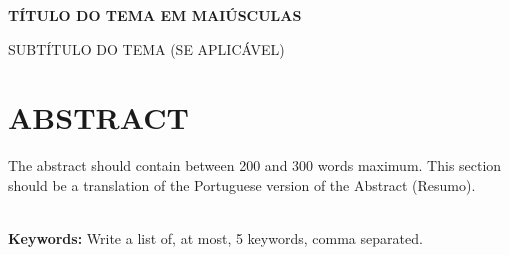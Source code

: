 \begingroup
\begin{flushleft}
\bfseries
{}
{\Large
TÍTULO DO TEMA EM MAIÚSCULAS}
	
\mdseries		%
{\Large SUBTÍTULO DO TEMA (SE APLICÁVEL)}
\end{flushleft}
\normalsize
\let\clearpage\relax
\chapter{ABSTRACT}
\endgroup


\noindent The abstract should contain between 200 and 300 words maximum.  
This section should be a translation of the Portuguese version of the Abstract (Resumo). 
\lipsum[1-2]






\hspace{3cm}\\		%
\indent				%
\textbf{Keywords: } Write a list of, at most, 5 keywords, comma separated.
